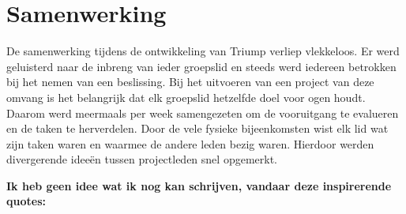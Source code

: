 
\chapter{Samenwerking}
\label{sec:samenwerking}

De samenwerking tijdens de ontwikkeling van Triump verliep vlekkeloos. Er werd geluisterd naar de inbreng van ieder groepslid en steeds werd iedereen betrokken bij het nemen van een beslissing. Bij het uitvoeren van een project van deze omvang is het belangrijk dat elk groepslid hetzelfde doel voor ogen houdt. Daarom werd meermaals per week samengezeten om de vooruitgang te evalueren en de taken te herverdelen. Door de vele fysieke bijeenkomsten wist elk lid wat zijn taken waren en waarmee de andere leden bezig waren. Hierdoor werden divergerende ideeën tussen projectleden snel opgemerkt.


\textbf{Ik heb geen idee wat ik nog kan schrijven, vandaar deze inspirerende quotes:}

